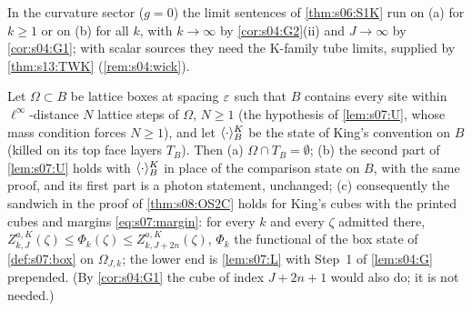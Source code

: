 In the curvature sector ($g=0$) the limit sentences of \cref{thm:s06:S1K} run on (a) for $k\ge1$ or on (b) for all $k$, with $k\to\infty$ by \cref{cor:s04:G2}(ii) and $J\to\infty$ by \cref{cor:s04:G1}; with scalar sources they need the K-family tube limits, supplied by \cref{thm:s13:TWK} (\cref{rem:s04:wick}).

\begin{lemma}\label{lem:s04:D}
Let $\Omega\subset B$ be lattice boxes at spacing $\varepsilon$ such that $B$ contains every site within $\ell^\infty$-distance $N$ lattice steps of $\Omega$, $N\ge1$ (the hypothesis of \cref{lem:s07:U}, whose mass condition forces $N\ge1$), and let $\langle \cdot\rangle^K_B$ be the state of King's convention on $B$ (killed on its top face layers $T_B$). Then \textup{(a)} $\Omega\cap T_B=\emptyset$; \textup{(b)} the second part of \cref{lem:s07:U} holds with $\langle \cdot\rangle^K_B$ in place of the comparison state on $B$, with the same proof, and its first part is a photon statement, unchanged; \textup{(c)} consequently the sandwich in the proof of \cref{thm:s08:OS2C} holds for King's cubes with the printed cubes and margins \eqref{eq:s07:margin}: for every $k$ and every $\zeta$ admitted there, $Z^{a,K}_{k,J}(\zeta)\le\Phi_k(\zeta)\le Z^{a,K}_{k,J+2n}(\zeta)$, $\Phi_k$ the functional of the box state of \cref{def:s07:box} on $\Omega_{J,k}$; the lower end is \cref{lem:s07:L} with Step~1 of \cref{lem:s04:G} prepended. (By \cref{cor:s04:G1} the cube of index $J+2n+1$ would also do; it is not needed.)
\end{lemma}

